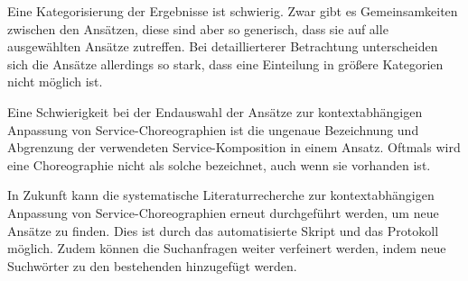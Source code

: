 \documentclass[conference,compsoc]{IEEEtran}
\begin{document}
Eine Kategorisierung der Ergebnisse ist schwierig. Zwar gibt es Gemeinsamkeiten zwischen den Ansätzen, diese sind aber so generisch, dass sie auf alle ausgewählten Ansätze zutreffen. Bei detaillierterer Betrachtung unterscheiden sich die Ansätze allerdings so stark, dass eine Einteilung in größere Kategorien nicht möglich ist.

Eine Schwierigkeit bei der Endauswahl der Ansätze zur kontextabhängigen Anpassung von Service-Choreographien ist die ungenaue Bezeichnung und Abgrenzung der verwendeten Service-Komposition in einem Ansatz. Oftmals wird eine Choreographie nicht als solche bezeichnet, auch wenn sie vorhanden ist.

In Zukunft kann die systematische Literaturrecherche zur kontextabhängigen Anpassung von Service-Choreographien erneut durchgeführt werden, um neue Ansätze zu finden. Dies ist durch das automatisierte Skript und das Protokoll möglich. Zudem können die Suchanfragen weiter verfeinert werden, indem neue Suchwörter zu den bestehenden hinzugefügt werden.

%
%







%
%
%









\end{document}
